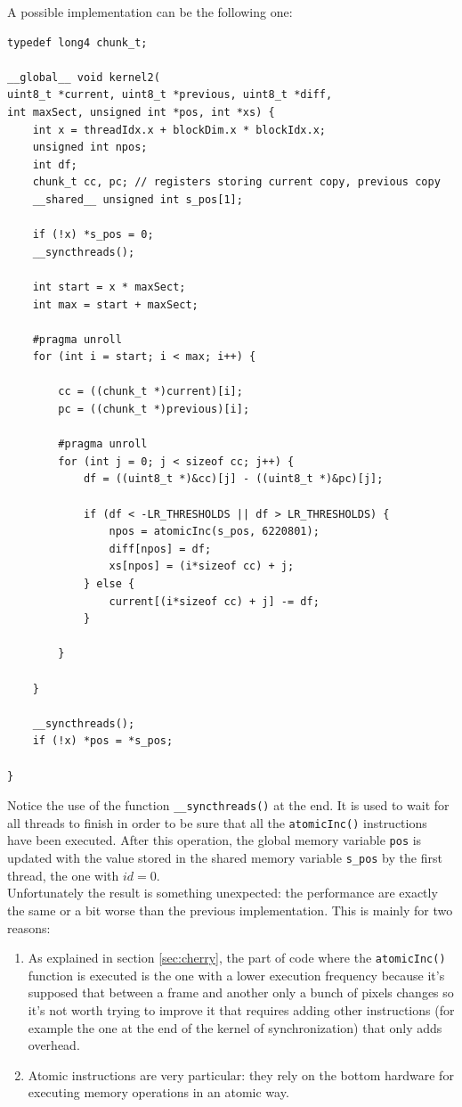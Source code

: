\documentclass[paper=a4, fontsize=10pt]{scrartcl}	%
\begin{document}
	A possible implementation can be the following one:
	\begin{lstlisting}[style=CStyle]
typedef long4 chunk_t;

__global__ void kernel2(
uint8_t *current, uint8_t *previous, uint8_t *diff, 
int maxSect, unsigned int *pos, int *xs) {
    int x = threadIdx.x + blockDim.x * blockIdx.x;
    unsigned int npos;
    int df;
    chunk_t cc, pc; // registers storing current copy, previous copy
    __shared__ unsigned int s_pos[1];

    if (!x) *s_pos = 0;
    __syncthreads();

    int start = x * maxSect;
    int max = start + maxSect;

    #pragma unroll
    for (int i = start; i < max; i++) {

        cc = ((chunk_t *)current)[i];
        pc = ((chunk_t *)previous)[i];

        #pragma unroll
        for (int j = 0; j < sizeof cc; j++) {
            df = ((uint8_t *)&cc)[j] - ((uint8_t *)&pc)[j];

            if (df < -LR_THRESHOLDS || df > LR_THRESHOLDS) {
                npos = atomicInc(s_pos, 6220801);
                diff[npos] = df;
                xs[npos] = (i*sizeof cc) + j;
            } else {
                current[(i*sizeof cc) + j] -= df;
            }

        }

    }

    __syncthreads();
    if (!x) *pos = *s_pos;

}
	\end{lstlisting}

	Notice the use of the function \texttt{\_\_syncthreads()} at the end. It is used to wait for all threads to finish in order to be sure that all the \texttt{atomicInc()} instructions have been executed. After this operation, the global memory variable \texttt{pos} is updated with the value stored in the shared memory variable \texttt{s\_pos} by the first thread, the one with $ id = 0 $.\\

	Unfortunately the result is something unexpected: the performance are exactly the same or a bit worse than the previous implementation. This is mainly for two reasons:

	\begin{enumerate}
		\item As explained in section \ref{sec:cherry}, the part of code where the \texttt{atomicInc()} function is executed is the one with a lower execution frequency because it's supposed that between a frame and another only a bunch of pixels changes so it's not worth trying to improve it that requires adding other instructions (for example the one at the end of the kernel of synchronization) that only adds overhead.
		\item Atomic instructions are very particular: they rely on the bottom hardware for executing memory operations in an atomic way.
	\end{enumerate}
\end{document}
